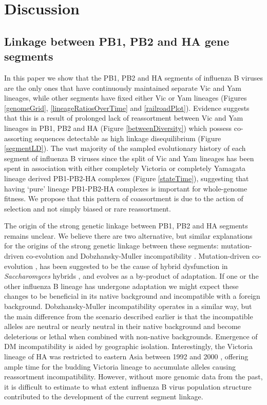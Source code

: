 \documentclass[11pt,oneside,letterpaper]{article}
\begin{document}
\section*{Discussion}

\subsection*{Linkage between PB1, PB2 and HA gene segments}
In this paper we show that the PB1, PB2 and HA segments of influenza B viruses are the only ones that have continuously maintained separate Vic and Yam lineages, while other segments have fixed either Vic or Yam lineages (Figures \ref{genomeGrid}, \ref{lineageRatiosOverTime} and \ref{railroadPlot}).
Evidence suggests that this is a result of prolonged lack of reassortment between Vic and Yam lineages in PB1, PB2 and HA (Figure \ref{betweenDiversity}) which possess co-assorting sequences detectable as high linkage disequilibrium (Figure \ref{segmentLD}).
The vast majority of the sampled evolutionary history of each segment of influenza B viruses since the split of Vic and Yam lineages has been spent in association with either completely Victoria or completely Yamagata lineage derived PB1-PB2-HA complexes (Figure \ref{stateTime}), suggesting that having `pure' lineage PB1-PB2-HA complexes is important for whole-genome fitness.
We propose that this pattern of coassortment is due to the action of selection and not simply biased or rare reassortment.

The origin of the strong genetic linkage between PB1, PB2 and HA segments remains unclear.
We believe there are two alternative, but similar explanations for the origins of the strong genetic linkage between these segments: mutation-driven co-evolution \citep{presgraves2010} and Dobzhansky-Muller incompatibility \citep{dobzhansky1937,muller1942}.
Mutation-driven co-evolution \citep{presgraves2010}, has been suggested to be the cause of hybrid dysfunction in \textit{Saccharomyces} hybrids \citep{lee2008}, and evolves as a by-product of adaptation.
If one or the other influenza B lineage has undergone adaptation we might expect these changes to be beneficial in its native background and incompatible with a foreign background.
Dobzhansky-Muller incompatibility operates in a similar way, but the main difference from the scenario described earlier is that the incompatible alleles are neutral or nearly neutral in their native background and become deleterious or lethal when combined with non-native backgrounds.
Emergence of DM incompatibility is aided by geographic isolation.
Interestingly, the Victoria lineage of HA was restricted to eastern Asia between 1992 and 2000 \citep{nerome1998,shaw2002}, offering ample time for the budding Victoria lineage to accumulate alleles causing reassortment incompatibility.
However, without more genomic data from the past, it is difficult to estimate to what extent influenza B virus population structure contributed to the development of the current segment linkage.
\end{document}
